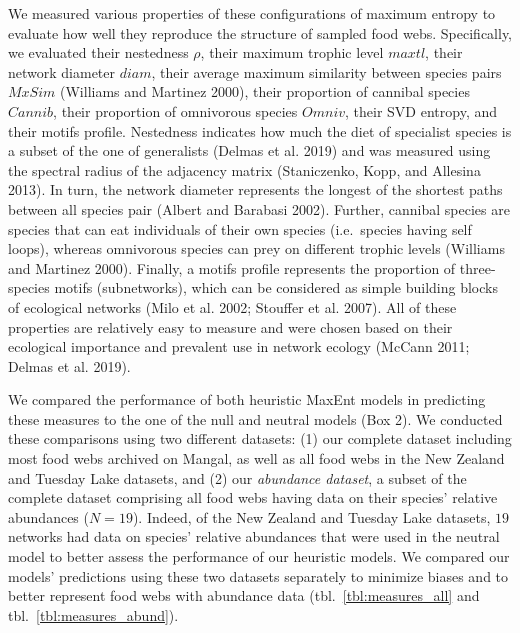 \documentclass[11pt]{article}
\begin{document}
We measured various properties of these configurations of maximum
entropy to evaluate how well they reproduce the structure of sampled
food webs. Specifically, we evaluated their nestedness \(\rho\), their
maximum trophic level \(maxtl\), their network diameter \(diam\), their
average maximum similarity between species pairs \(MxSim\) (Williams and
Martinez 2000), their proportion of cannibal species \(Cannib\), their
proportion of omnivorous species \(Omniv\), their SVD entropy, and their
motifs profile. Nestedness indicates how much the diet of specialist
species is a subset of the one of generalists (Delmas et al. 2019) and
was measured using the spectral radius of the adjacency matrix
(Staniczenko, Kopp, and Allesina 2013). In turn, the network diameter
represents the longest of the shortest paths between all species pair
(Albert and Barabasi 2002). Further, cannibal species are species that
can eat individuals of their own species (i.e.~species having self
loops), whereas omnivorous species can prey on different trophic levels
(Williams and Martinez 2000). Finally, a motifs profile represents the
proportion of three-species motifs (subnetworks), which can be
considered as simple building blocks of ecological networks (Milo et al.
2002; Stouffer et al. 2007). All of these properties are relatively easy
to measure and were chosen based on their ecological importance and
prevalent use in network ecology (McCann 2011; Delmas et al. 2019).

We compared the performance of both heuristic MaxEnt models in
predicting these measures to the one of the null and neutral models (Box
2). We conducted these comparisons using two different datasets: (1) our
complete dataset including most food webs archived on Mangal, as well as
all food webs in the New Zealand and Tuesday Lake datasets, and (2) our
\emph{abundance dataset}, a subset of the complete dataset comprising
all food webs having data on their species' relative abundances
(\(N=19\)). Indeed, of the New Zealand and Tuesday Lake datasets, \(19\)
networks had data on species' relative abundances that were used in the
neutral model to better assess the performance of our heuristic models.
We compared our models' predictions using these two datasets separately
to minimize biases and to better represent food webs with abundance data
(tbl.~\ref{tbl:measures_all} and tbl.~\ref{tbl:measures_abund}).
\end{document}
